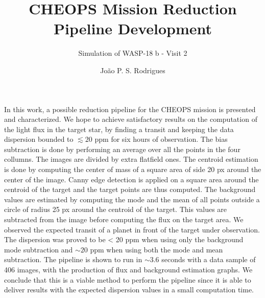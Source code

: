 \documentclass{aa}
\begin{document}
 


   \title{CHEOPS Mission Reduction Pipeline Development}

   \subtitle{Simulation of WASP-18 b - Visit 2}

   \author{João P. S. Rodrigues}


   \date{}

 
  \abstract
   {In this work, a possible reduction pipeline for the CHEOPS mission is presented and characterized.}
   {We hope to achieve satisfactory results on the computation of the light flux in the target star, by finding a transit and keeping the data dispersion bounded to $\lesssim 20$ ppm for six hours of observation.}
   {The bias subtraction is done by performing an average over all the points in the four collumns. The images are divided by extra flatfield ones. The centroid estimation is done by computing the center of mass of a square area of side 20 px around the center of the image. Canny edge detection is applied on a square area around the centroid of the target and the target points are thus computed. The background values are estimated by computing the mode and the mean of all points outside a circle of radius 25 px around the centroid of the target. This values are subtracted from the image before computing the flux on the target area.}
   {We observed the expected transit of a planet in front of the target under observation. The dispersion was proved to be < 20 ppm when using only the background mode subtraction and $\sim 20$ ppm when using both the mode and mean subtraction. The pipeline is shown to run in $\sim 3.6$ seconds with a data sample of 406 images, with the production of flux and background estimation graphs.}
   {We conclude that this is a viable method to perform the pipeline since it is able to deliver results with the expected dispersion values in a small computation time.}

   \keywords{}

   \maketitle
%
\end{document}
